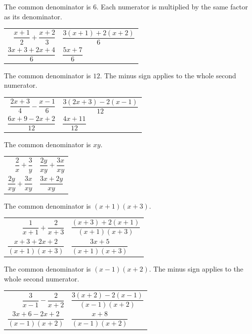 \documentclass[aspectratio=169]{beamer}
\makeatletter
\newcommand{\work}[1]{%
  \begin{tabular}{@{}r@{\;=\;}l@{}}#1\end{tabular}%
}
\makeatother
\begin{document}
  {The common denominator is $6$. Each numerator is multiplied by the
   same factor as its denominator.
   \par\vspace{0.4em}
   \work{$\dfrac{x+1}{2}+\dfrac{x+2}{3}$ & $\dfrac{3(x+1)+2(x+2)}{6}$\\[0.95em]
         $\dfrac{3x+3+2x+4}{6}$ & $\dfrac{5x+7}{6}$}}

  {The common denominator is $12$. The minus sign applies to the whole
   second numerator.
   \par\vspace{0.4em}
   \work{$\dfrac{2x+3}{4}-\dfrac{x-1}{6}$ & $\dfrac{3(2x+3)-2(x-1)}{12}$\\[0.95em]
         $\dfrac{6x+9-2x+2}{12}$ & $\dfrac{4x+11}{12}$}}

  {The common denominator is $xy$.
   \par\vspace{0.4em}
   \work{$\dfrac{2}{x}+\dfrac{3}{y}$ & $\dfrac{2y}{xy}+\dfrac{3x}{xy}$\\[0.95em]
         $\dfrac{2y}{xy}+\dfrac{3x}{xy}$ & $\dfrac{3x+2y}{xy}$}}

  {The common denominator is $(x+1)(x+3)$.
   \par\vspace{0.4em}
   \work{$\dfrac{1}{x+1}+\dfrac{2}{x+3}$ & $\dfrac{(x+3)+2(x+1)}{(x+1)(x+3)}$\\[0.95em]
         $\dfrac{x+3+2x+2}{(x+1)(x+3)}$ & $\dfrac{3x+5}{(x+1)(x+3)}$}}

  {The common denominator is $(x-1)(x+2)$. The minus sign applies to the
   whole second numerator.
   \par\vspace{0.4em}
   \work{$\dfrac{3}{x-1}-\dfrac{2}{x+2}$ & $\dfrac{3(x+2)-2(x-1)}{(x-1)(x+2)}$\\[0.95em]
         $\dfrac{3x+6-2x+2}{(x-1)(x+2)}$ & $\dfrac{x+8}{(x-1)(x+2)}$}}
\end{document}
